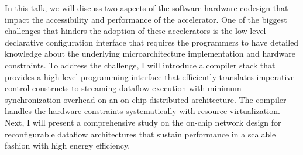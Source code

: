 In this talk, we will discuss two aspects of the software-hardware codesign that impact the accessibility and performance of the accelerator. One of the biggest challenges that hinders the adoption of these accelerators is the low-level declarative configuration interface that requires the programmers to have detailed knowledge about the underlying microarchitecture implementation and hardware constraints. To address the challenge, I will introduce a compiler stack that provides a high-level programming interface that efficiently translates imperative control constructs to streaming dataflow execution with minimum synchronization overhead on an on-chip distributed architecture. The compiler handles the hardware constraints systematically with resource virtualization. Next, I will present a comprehensive study on the on-chip network design for reconfigurable dataflow architectures that sustain performance in a scalable fashion with high energy efficiency.
